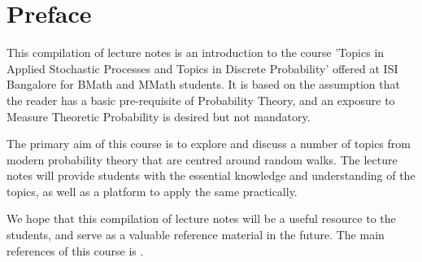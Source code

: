 \documentclass[main]{subfiles}
\begin{document}
\section*{Preface}
This compilation of lecture notes is an introduction to the course 'Topics in Applied Stochastic Processes and Topics in Discrete Probability' offered at ISI Bangalore for BMath and MMath students. It is based on the assumption that the reader has a basic pre-requisite of Probability Theory, and an exposure to Measure Theoretic Probability is desired but not mandatory.

The primary aim of this course is to explore and discuss a number of topics from modern probability theory that are centred around random walks. The lecture notes will provide students with the essential knowledge and understanding of the topics, as well as a platform to apply the same practically.

We hope that this compilation of lecture notes will be a useful resource to the students, and serve as a valuable reference material in the future. The main references of this course is \cite{avena2016random,barlow2017random}.
\end{document}
